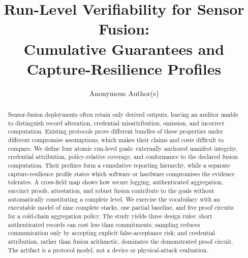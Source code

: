 \documentclass[runningheads]{llncs}
\begin{document}
\title{Run-Level Verifiability for Sensor Fusion:\\
       Cumulative Guarantees and Capture-Resilience Profiles}

\author{Anonymous Author(s)}

\maketitle

\begin{abstract}
Sensor-fusion deployments often retain only derived outputs, leaving an auditor
unable to distinguish record alteration, credential misattribution, omission,
and incorrect computation. Existing protocols prove different bundles of
these properties under different compromise assumptions, which makes their
claims and costs difficult to compare. We define four atomic run-level goals:
externally anchored manifest integrity, credential attribution, policy-relative
coverage, and conformance to the declared fusion computation. Their prefixes
form a cumulative reporting hierarchy, while a separate capture-resilience
profile states which software or hardware compromises the evidence tolerates.
A cross-field map shows how secure logging, authenticated aggregation,
succinct proofs, attestation, and robust fusion contribute to the goals without
automatically constituting a complete level. We exercise the vocabulary with
an executable model of nine complete stacks, one partial baseline, and five
proof circuits for a cold-chain aggregation policy. The study yields three
design rules: short authenticated records can cost less than commitments;
sampling reduces communication only by accepting explicit false-acceptance
risk; and credential attribution, rather than fusion arithmetic, dominates the
demonstrated proof circuit. The artifact is a protocol model, not a device or
physical-attack evaluation.

\end{abstract}










\end{document}
